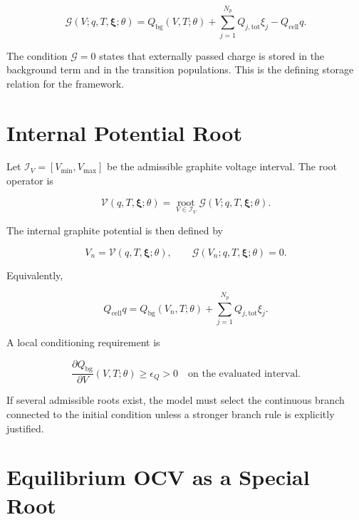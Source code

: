 \documentclass[11pt,a4paper]{article}
\newcommand{\cell}{\mathrm{cell}}
\newcommand{\bg}{\mathrm{bg}}
\newcommand{\tot}{\mathrm{tot}}
\begin{document}
\begin{equation}
\mathcal{G}(V;q,T,\bm{\xi};\theta)
=
Q_{\bg}(V,T;\theta)
+
\sum_{j=1}^{N_p}Q_{j,\tot}\xi_j
-
Q_{\cell}q.
\label{eq:charge_residual}
\end{equation}

The condition \(\mathcal{G}=0\) states that externally passed charge is stored in the background term and in the transition populations. This is the defining storage relation for the framework.

\section{Internal Potential Root}

Let \(\mathcal{I}_V=[V_{\min},V_{\max}]\) be the admissible graphite voltage interval. The root operator is

\begin{equation}
\mathcal{V}(q,T,\bm{\xi};\theta)
=
\operatorname*{root}_{V\in\mathcal{I}_V}
\mathcal{G}(V;q,T,\bm{\xi};\theta).
\label{eq:root_operator}
\end{equation}

The internal graphite potential is then defined by

\begin{equation}
V_n=\mathcal{V}(q,T,\bm{\xi};\theta),
\qquad
\mathcal{G}(V_n;q,T,\bm{\xi};\theta)=0.
\label{eq:internal_potential}
\end{equation}

Equivalently,

\begin{equation}
Q_{\cell}q
=
Q_{\bg}(V_n,T;\theta)
+
\sum_{j=1}^{N_p}Q_{j,\tot}\xi_j.
\label{eq:central_charge_balance}
\end{equation}

A local conditioning requirement is

\begin{equation}
\frac{\partial Q_{\bg}}{\partial V}(V,T;\theta)
\ge \epsilon_Q>0
\quad \text{on the evaluated interval.}
\label{eq:slope_floor}
\end{equation}

If several admissible roots exist, the model must select the continuous branch connected to the initial condition unless a stronger branch rule is explicitly justified.

\section{Equilibrium OCV as a Special Root}
\end{document}

